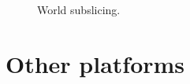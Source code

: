 \documentclass[11pt,oneside,a4paper,openright]{report}
\begin{document}
\begin{figure}[h!]
\centering
\setlength\fboxsep{0pt}
\setlength\fboxrule{0.5pt}
\caption{ World subslicing.}
\label{fig:Pandora2}
\end{figure}

 
\section{Other platforms}
\end{document}
